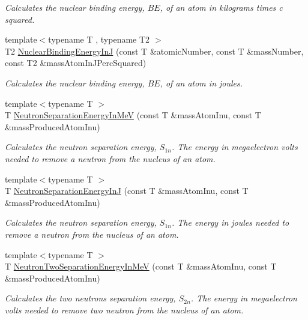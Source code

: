 \begin{DoxyCompactItemize}
\begin{DoxyCompactList}\small\item\em Calculates the nuclear binding energy, $BE$, of an atom in kilograms times c squared. \end{DoxyCompactList}\item 
{\footnotesize template$<$typename T , typename T2 $>$ }\\T2 \mbox{\hyperlink{group___e_g_x_phys-_nuclear_binding_energy_gae48a95188d9b71b36d02babf227b9449}{Nuclear\+Binding\+Energy\+InJ}} (const T \&atomic\+Number, const T \&mass\+Number, const T2 \&mass\+Atom\+In\+J\+Perc\+Squared)
\begin{DoxyCompactList}\small\item\em Calculates the nuclear binding energy, $BE$, of an atom in joules. \end{DoxyCompactList}\item 
{\footnotesize template$<$typename T $>$ }\\T \mbox{\hyperlink{group___e_g_x_phys-_nuclear_separation_energy_ga66133edb5809c81dd9fd60e09ebbef79}{Neutron\+Separation\+Energy\+In\+MeV}} (const T \&mass\+Atom\+Inu, const T \&mass\+Produced\+Atom\+Inu)
\begin{DoxyCompactList}\small\item\em Calculates the neutron separation energy, $S_{1n}$. The energy in megaelectron volts needed to remove a neutron from the nucleus of an atom. \end{DoxyCompactList}\item 
{\footnotesize template$<$typename T $>$ }\\T \mbox{\hyperlink{group___e_g_x_phys-_nuclear_separation_energy_ga14a4bb972ae000ef4ff35f2734ff22d0}{Neutron\+Separation\+Energy\+InJ}} (const T \&mass\+Atom\+Inu, const T \&mass\+Produced\+Atom\+Inu)
\begin{DoxyCompactList}\small\item\em Calculates the neutron separation energy, $S_{1n}$. The energy in joules needed to remove a neutron from the nucleus of an atom. \end{DoxyCompactList}\item 
{\footnotesize template$<$typename T $>$ }\\T \mbox{\hyperlink{group___e_g_x_phys-_nuclear_separation_energy_ga09985fc876eb632695bfbc1f2f325401}{Neutron\+Two\+Separation\+Energy\+In\+MeV}} (const T \&mass\+Atom\+Inu, const T \&mass\+Produced\+Atom\+Inu)
\begin{DoxyCompactList}\small\item\em Calculates the two neutrons separation energy, $S_{2n}$. The energy in megaelectron volts needed to remove two neutron from the nucleus of an atom. \end{DoxyCompactList}\item 

\end{DoxyCompactItemize}
